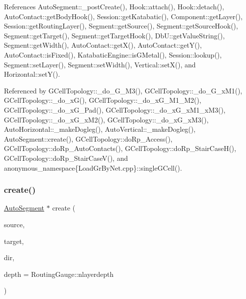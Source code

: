 References Auto\+Segment\+::\+\_\+post\+Create(), Hook\+::attach(), Hook\+::detach(), Auto\+Contact\+::get\+Body\+Hook(), Session\+::get\+Katabatic(), Component\+::get\+Layer(), Session\+::get\+Routing\+Layer(), Segment\+::get\+Source(), Segment\+::get\+Source\+Hook(), Segment\+::get\+Target(), Segment\+::get\+Target\+Hook(), Db\+U\+::get\+Value\+String(), Segment\+::get\+Width(), Auto\+Contact\+::get\+X(), Auto\+Contact\+::get\+Y(), Auto\+Contact\+::is\+Fixed(), Katabatic\+Engine\+::is\+G\+Metal(), Session\+::lookup(), Segment\+::set\+Layer(), Segment\+::set\+Width(), Vertical\+::set\+X(), and Horizontal\+::set\+Y().



Referenced by G\+Cell\+Topology\+::\+\_\+do\+\_\+G\+\_\+M3(), G\+Cell\+Topology\+::\+\_\+do\+\_\+G\+\_\+x\+M1(), G\+Cell\+Topology\+::\+\_\+do\+\_\+x\+G(), G\+Cell\+Topology\+::\+\_\+do\+\_\+x\+G\+\_\+M1\+\_\+M2(), G\+Cell\+Topology\+::\+\_\+do\+\_\+x\+G\+\_\+Pad(), G\+Cell\+Topology\+::\+\_\+do\+\_\+x\+G\+\_\+x\+M1\+\_\+x\+M3(), G\+Cell\+Topology\+::\+\_\+do\+\_\+x\+G\+\_\+x\+M2(), G\+Cell\+Topology\+::\+\_\+do\+\_\+x\+G\+\_\+x\+M3(), Auto\+Horizontal\+::\+\_\+make\+Dogleg(), Auto\+Vertical\+::\+\_\+make\+Dogleg(), Auto\+Segment\+::create(), G\+Cell\+Topology\+::do\+Rp\+\_\+\+Access(), G\+Cell\+Topology\+::do\+Rp\+\_\+\+Auto\+Contacts(), G\+Cell\+Topology\+::do\+Rp\+\_\+\+Stair\+Case\+H(), G\+Cell\+Topology\+::do\+Rp\+\_\+\+Stair\+Case\+V(), and anonymous\+\_\+namespace\{\+Load\+Gr\+By\+Net.\+cpp\}\+::single\+G\+Cell().

\mbox{\label{classKatabatic_1_1AutoSegment_afa7ce652576b17985859fd6c29d21489}} 
\subsubsection{\texorpdfstring{create()}{create()}\hspace{0.1cm}{\footnotesize\ttfamily [2/2]}}
{\footnotesize\ttfamily \mbox{\hyperlink{classKatabatic_1_1AutoSegment}{Auto\+Segment}} $\ast$ create (\begin{DoxyParamCaption}\item[{\mbox{\hyperlink{classKatabatic_1_1AutoContact}{Auto\+Contact}} $\ast$}]{source,  }\item[{\mbox{\hyperlink{classKatabatic_1_1AutoContact}{Auto\+Contact}} $\ast$}]{target,  }\item[{unsigned int}]{dir,  }\item[{size\+\_\+t}]{depth = {\ttfamily RoutingGauge\+:\+:nlayerdepth} }\end{DoxyParamCaption})\hspace{0.3cm}{\ttfamily [static]}}


